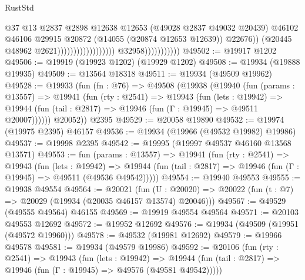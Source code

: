 \begin{lexlean}{RustStd}
\begin{coremodule}
                                                                @37
                                                                @13
                                                                @2837
                                                                @2898
                                                                @12638
                                                                @12653
                                                                (@49028 @2837 @49032 @20439)
                                                                @46102
                                                                @46106
                                                                @29915
                                                                @20872
                                                                (@14055 (@20874 @12653 @12639))
                                                                @22676))
                                                            (@20445 @48962 @2621))))))))))))))))))
                          @32958)))))))))))
@49502 := @19917 @1202
@49506 := @19919 (@19923 @1202) (@19929 @1202)
@49508 := @19934 (@19888 @19935)
@49509 := @13564 @18318
@49511 := @19934 (@49509 @19962)
@49528 := @19933
    (fun (fn : @76) =>
    @49508
      (@19938
        (@19940
          (fun (params : @13557) =>
          @19941
            (fun (rty : @2541) =>
            @19943
              (fun (lets : @19942) =>
              @19944 (fun (tail : @2817) => @19946 (fun (Γ : @19945) => @49511 @20007))))))
        @20052))
    @2395
@49529 := @20058 @19890
@49532 := @19974 (@19975 @2395) @46157
@49536 := @19934 (@19966 (@49532 @19982) @19986)
@49537 := @19998 @2395
@49542 := @19995 (@19997 @49537 @46160 @13568 @13571)
@49553 := fun (params : @13557) =>
  @19941
    (fun (rty : @2541) =>
    @19943
      (fun (lets : @19942) =>
      @19944 (fun (tail : @2817) => @19946 (fun (Γ : @19945) => @49511 (@49536 @49542)))))
@49554 := @19940 @49553
@49555 := @19938 @49554
@49564 := @20021
    (fun (U : @20020) => @20022 (fun (t : @7) => @20029 (@19934 (@20035 @46157 @13574) @20046)))
@49567 := @49529 (@49555 @49564) @46155
@49569 := @19919 @49554 @49564
@49571 := @20103 @49553 @12692
@49572 := @19952 @12692
@49576 := @19934 (@49509 (@19951 (@49572 @19960)))
@49578 := @49532 (@19981 @12692)
@49579 := @19966 @49578
@49581 := @19934 (@49579 @19986)
@49592 := @20106
    (fun (rty : @2541) =>
    @19943
      (fun (lets : @19942) =>
      @19944 (fun (tail : @2817) => @19946 (fun (Γ : @19945) => @49576 (@49581 @49542)))))

\end{coremodule}
\end{lexlean}
